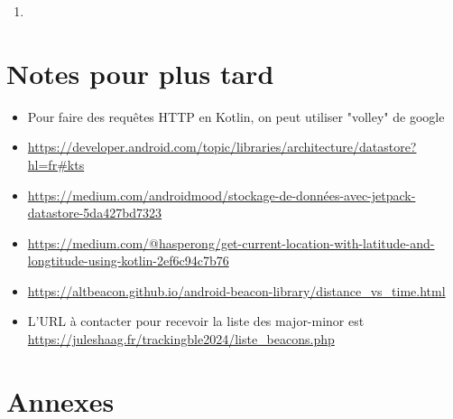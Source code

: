 \documentclass[10pt,a4paper]{book}
\begin{document}
\begin{enumerate}
    \item 
\end{enumerate}

\part{Notes pour plus tard}

\begin{itemize}
    \item Pour faire des requêtes HTTP en Kotlin, on peut utiliser "volley" de google
    \item \href{https://developer.android.com/topic/libraries/architecture/datastore?hl=fr\#kts}{https://developer.android.com/topic/libraries/architecture/datastore?hl=fr\#kts}
    \item \href{https://medium.com/androidmood/stockage-de-données-avec-jetpack-datastore-5da427bd7323}{https://medium.com/androidmood/stockage-de-données-avec-jetpack-datastore-5da427bd7323}
    \item \href{https://medium.com/@hasperong/get-current-location-with-latitude-and-longtitude-using-kotlin-2ef6c94c7b76}{https://medium.com/@hasperong/get-current-location-with-latitude-and-longtitude-using-kotlin-2ef6c94c7b76}
    \item \href{https://altbeacon.github.io/android-beacon-library/distance\_vs\_time.html}{https://altbeacon.github.io/android-beacon-library/distance\_vs\_time.html}
    \item L'URL à contacter pour recevoir la liste des major-minor est \href{https://juleshaag.fr/trackingble2024/liste\_beacons.php}{https://juleshaag.fr/trackingble2024/liste\_beacons.php}
\end{itemize}

\part{Annexes}
\end{document}
